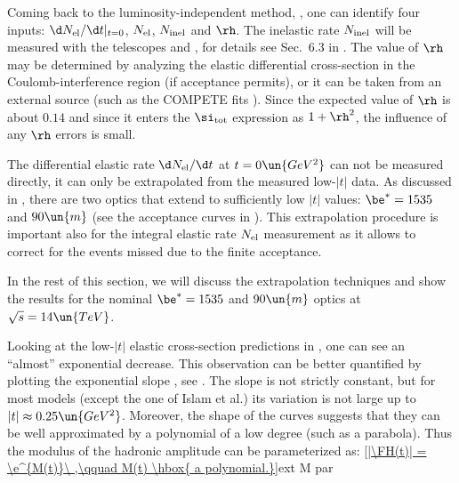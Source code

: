 Coming back to the luminosity-independent method, , one can identify four inputs: $\d N_{\rm el}/\d t|_{t=0}$, $N_{\rm el}$, $N_{\rm inel}$ and $\rh$. The inelastic rate $N_{\rm inel}$ will be measured with the telescopes  and , for details see Sec.~6.3 in . The value of $\rh$ may be determined by analyzing the elastic differential cross-section in the Coulomb-interference region (if acceptance permits), or it can be taken from an external source (such as the COMPETE fits ). Since the expected value of $\rh$ is about $0.14$ and since it enters the $\si_{\rm tot}$ expression as $1 + \rh^2$, the influence of any $\rh$ errors is small.

The differential elastic rate $\d N_{\rm el}/\d t$ at $t=0\un{GeV^2}$ can not be measured directly, it can only be extrapolated from the measured low-$|t|$ data. As discussed in , there are two optics that extend to sufficiently low $|t|$ values: $\be^* = 1535$ and $90\un{m}$ (see the acceptance curves in ). This extrapolation procedure is important also for the integral elastic rate $N_{\rm el}$ measurement as it allows to correct for the events missed due to the finite acceptance.

In the rest of this section, we will discuss the extrapolation techniques and show the results for the nominal $\be^* = 1535$ and $90\un{m}$ optics at $\sqrt s = 14\un{TeV}$.

Looking at the low-$|t|$ elastic cross-section predictions in , one can see an ``almost'' exponential decrease. This observation can be better quantified by plotting the exponential slope , see . The slope is not strictly constant, but for most models (except the one of Islam et al.) its variation is not large up to $|t| \approx 0.25\un{GeV^2}$. Moreover, the shape of the curves suggests that they can be well approximated by a polynomial of a low degree (such as a parabola). Thus the modulus of the hadronic amplitude can be parameterized as:
\eqref{|\FH(t)| = \e^{M(t)}\ ,\qquad M(t) \hbox{ a polynomial.}}{ext M par}


\bmfig
{}
\emfig

